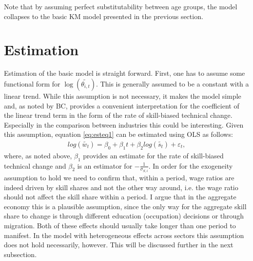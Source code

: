 \documentclass[]{article}
\begin{document}
Note that by assuming perfect substitutability between age groups, the
model collapses to the basic KM model presented in the previous
section.

\section{Estimation}
Estimation of the basic model is straight forward. First, one has to
assume some functional form for $\log(\widetilde{\theta_{i,t}})$. This
is generally assumed to be a constant with a linear trend. While this
assumption is not necessary, it makes the model simple and, as noted
by BC, provides a convenient interpretation for the coefficient of the
linear trend term in the form of the rate of skill-biased technical
change. Especially in the comparison between industries this could be
interesting. Given this assumption, equation \eqref{eq:esteq1} can be
estimated using OLS as follows:
\begin{align}
  \label{eq:est1}
  log(\tilde{w_{t}})=\beta_{0}+\beta_{1}t+\beta_{2}log(\tilde{s_{t}})+\varepsilon_{t},
\end{align}
where, as noted above, $\beta_{1}$ provides an estimate for the rate
of skill-biased technical change and $\beta_{2}$ is an estimator for
$-\frac{1}{\sigma_{S,i}}$. In order for the exogeneity assumption to
hold we need to confirm that, within a period, wage ratios are indeed
driven by skill shares and not the other way around, i.e. the wage
ratio should not affect the skill share within a period. I argue that
in the aggregate economy this is a plausible assumption, since the
only way for the aggregate skill share to change is through different
education (occupation) decisions or through migration. Both of these
effects should usually take longer than one period to manifest. In the
model with heterogeneous effects across sectors this assumption does
not hold necessarily, however. This will be discussed further in the
next subsection.
  
\end{document}

